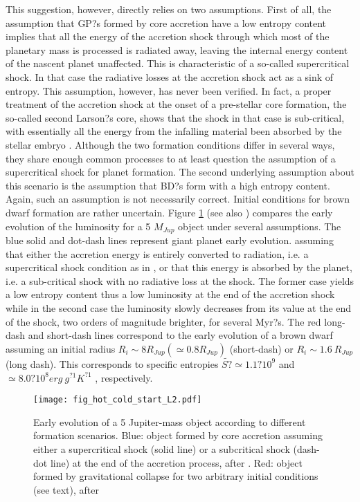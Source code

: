 This suggestion, however, directly relies on two assumptions. 
First of all, the assumption that GP?s formed by core accretion have a low entropy content implies 
that all the energy of the accretion shock through which most of the planetary mass is processed is radiated
away, leaving the internal energy content of the nascent planet unaffected. This is characteristic of a so-called 
supercritical shock. In that case the radiative losses at the accretion shock act as a sink of entropy. This assumption,
however, has never been verified. In fact, a proper treatment of the accretion shock at the onset of a pre-stellar core 
formation, the so-called second Larson?s core, shows that the shock in that case is sub-critical, with essentially all the 
energy from the infalling material been absorbed by the stellar embryo \citep{Vaytet2013, Tomida2013, Bate2014}. 
Although the two formation conditions differ in several ways, they share enough common processes to
at least question the assumption of a supercritical shock for planet formation. 
The second underlying assumption about this scenario is the assumption that BD?s form with a high entropy content. 
Again, such an assumption is not necessarily correct. Initial conditions for brown dwarf formation are rather uncertain. 
Figure \ref{fig:evolution} (see also \cite{Mordasini2012a, Mordasini2013, Spiegel2012}) compares the early 
evolution of the luminosity for a 5 $M_{Jup}$ object under several assumptions. 
The blue solid and dot-dash lines represent giant planet early evolution. 
assuming that either 
the accretion energy is entirely converted to radiation, i.e. a supercritical 
shock condition as in \cite{Marley2007}, or that this energy is absorbed by the planet, i.e. a sub-critical shock
with no radiative loss at the shock. 
The former case yields a low entropy content thus a low luminosity at the end of
the accretion shock while in the second case the luminosity slowly decreases from its value at the end of the shock,
two orders of magnitude brighter, for several Myr?s. The red long-dash and short-dash lines correspond to the early
evolution of a brown dwarf \citep{Baraffe2003} assuming an initial radius $R_i \sim 8 R_{Jup} (\simeq 0.8 R_{Jup})$ (short-dash) or
$R_i \sim 1.6~ R_{Jup}$ (long dash). This corresponds to specific entropies $\tilde{S?} \simeq 1.1 ? 10^9$ and 
$\simeq 8.0 ? 10^8 erg~ g^{?1} K^{ ?1}$ , respectively.

\begin{figure}[!t]
\vspace{0cm}
\centerline{\texttt{[image: fig\_hot\_cold\_start\_L2.pdf]}}
\caption{Early evolution of a 5 Jupiter-mass object according to
different formation scenarios. Blue: object formed by core accretion assuming 
either a supercritical shock (solid line) or a subcritical shock (dash-dot line) 
at the end of the accretion process, after \cite{Mordasini2012a}. 
Red: object formed by gravitational collapse for two arbitrary initial conditions (see text), 
after \cite{Baraffe2003}}
\label{fig:evolution}
\end{figure}



